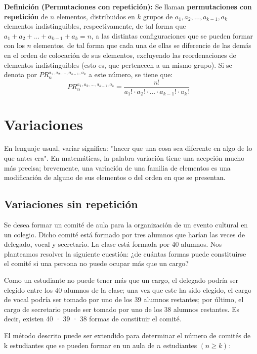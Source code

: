 \documentclass[12pt]{article}
\theoremstyle{definition}
\theoremstyle{plain}
\theoremstyle{plain}
\theoremstyle{definition}
\begin{document}
        \textbf{Definición (Permutaciones con repetición):}
        Se llaman \textbf{permutaciones con repetición} de $n$ elementos, distribuidos en $k$ grupos de $a_1, a_2, \dots, a_{k-1}, a_k$ elementos indistinguibles, respectivamente, de tal forma que $a_1 + a_2 + \dots + a_{k-1} + a_k = n$, a las distintas configuraciones que se pueden formar con los $n$ elementos, de tal forma que cada una de ellas se diferencie de las demás en el orden de colocación de sus elementos, excluyendo las reordenaciones de elementos indistinguibles (esto es, que pertenecen a un mismo grupo). Si se denota por $PR_{n}^{a_1, a_2, \dots, a_{k-1}, a_k}$ a este número, se tiene que:$$PR_{n}^{a_1, a_2, \dots, a_{k-1}, a_k} = \frac{n!}{a_1! \cdot a_2! \cdot \dots \cdot a_{k-1}! \cdot a_k!}$$

\section{Variaciones}

    En lenguaje usual, variar significa: ''hacer que una cosa sea diferente en algo de lo que antes era". En matemáticas, la palabra variación tiene una acepción mucho más precisa; brevemente, una variación de una familia de elementos es una modificación de alguno de sus elementos o del orden en que se presentan.

    \subsection{Variaciones sin repetición}

            Se desea formar un comité de aula para la organización de un evento cultural en un colegio. Dicho comité está formado por tres alumnos que harían las veces de delegado, vocal y secretario. La clase está formada por 40 alumnos. Nos planteamos resolver la siguiente cuestión: ¿de cuántas formas puede constituirse el comité si una persona no puede ocupar más que un cargo?

            Como un estudiante no puede tener más que un cargo, el delegado
            podría ser elegido entre los 40 alumnos de la clase; una vez que este ha sido elegido, el cargo de vocal podría ser tomado por uno de los 39 alumnos restantes; por último, el cargo de secretario puede ser tomado por uno de los 38 alumnos restantes. Es decir, existen 40 · 39 · 38 formas de constituir el
            comité.

            El método descrito puede ser extendido para determinar el número de
            comités de k estudiantes que se pueden formar en un aula de \(n\) estudiantes
            \((n \geq k)\):
\end{document}
